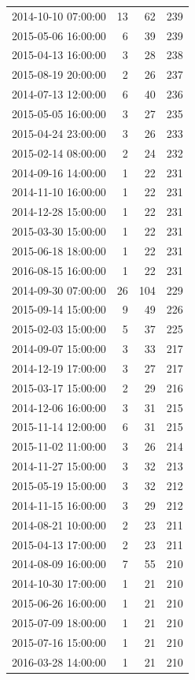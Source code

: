 \begin{tabular}{lrrr}
2014-10-10 07:00:00 & 13 & 62 & 239 \\
2015-05-06 16:00:00 & 6 & 39 & 239 \\
2015-04-13 16:00:00 & 3 & 28 & 238 \\
2015-08-19 20:00:00 & 2 & 26 & 237 \\
2014-07-13 12:00:00 & 6 & 40 & 236 \\
2015-05-05 16:00:00 & 3 & 27 & 235 \\
2015-04-24 23:00:00 & 3 & 26 & 233 \\
2015-02-14 08:00:00 & 2 & 24 & 232 \\
2014-09-16 14:00:00 & 1 & 22 & 231 \\
2014-11-10 16:00:00 & 1 & 22 & 231 \\
2014-12-28 15:00:00 & 1 & 22 & 231 \\
2015-03-30 15:00:00 & 1 & 22 & 231 \\
2015-06-18 18:00:00 & 1 & 22 & 231 \\
2016-08-15 16:00:00 & 1 & 22 & 231 \\
2014-09-30 07:00:00 & 26 & 104 & 229 \\
2015-09-14 15:00:00 & 9 & 49 & 226 \\
2015-02-03 15:00:00 & 5 & 37 & 225 \\
2014-09-07 15:00:00 & 3 & 33 & 217 \\
2014-12-19 17:00:00 & 3 & 27 & 217 \\
2015-03-17 15:00:00 & 2 & 29 & 216 \\
2014-12-06 16:00:00 & 3 & 31 & 215 \\
2015-11-14 12:00:00 & 6 & 31 & 215 \\
2015-11-02 11:00:00 & 3 & 26 & 214 \\
2014-11-27 15:00:00 & 3 & 32 & 213 \\
2015-05-19 15:00:00 & 3 & 32 & 212 \\
2014-11-15 16:00:00 & 3 & 29 & 212 \\
2014-08-21 10:00:00 & 2 & 23 & 211 \\
2015-04-13 17:00:00 & 2 & 23 & 211 \\
2014-08-09 16:00:00 & 7 & 55 & 210 \\
2014-10-30 17:00:00 & 1 & 21 & 210 \\
2015-06-26 16:00:00 & 1 & 21 & 210 \\
2015-07-09 18:00:00 & 1 & 21 & 210 \\
2015-07-16 15:00:00 & 1 & 21 & 210 \\
2016-03-28 14:00:00 & 1 & 21 & 210 \\

\end{tabular}
